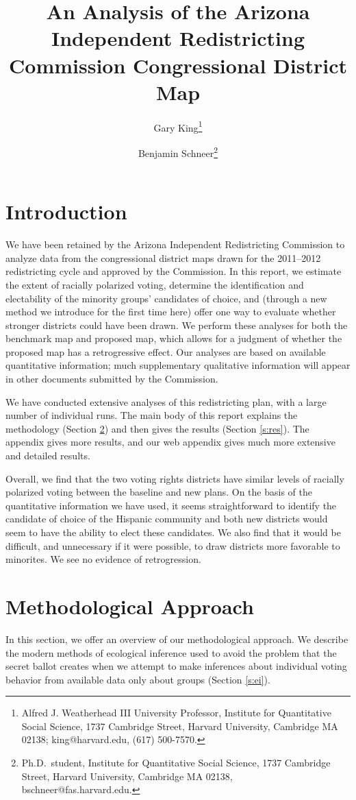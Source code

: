 \documentclass[12pt,draft]{scrartcl}
\title{An Analysis of the Arizona Independent Redistricting Commission
  Congressional District Map}
\author{Gary King\thanks{Alfred J. Weatherhead III University Professor, Institute for Quantitative
    Social Science, 1737 Cambridge Street, Harvard University,
    Cambridge MA 02138; 
    king@harvard.edu, (617) 500-7570.}  
\and 
Benjamin Schneer\thanks{Ph.D.\ student, Institute for Quantitative Social
    Science, 1737 Cambridge Street, Harvard University, Cambridge MA
    02138, bschneer@fas.harvard.edu.}}
\begin{document}
\maketitle

\doublespacing

\section{Introduction}

We have been retained by the Arizona Independent Redistricting
Commission to analyze data from the congressional district maps drawn
for the 2011--2012 redistricting cycle and approved by the Commission.
In this report, we estimate the extent of racially polarized voting,
determine the identification and electability of the minority groups'
candidates of choice, and (through a new method we introduce for the
first time here) offer one way to evaluate whether stronger districts
could have been drawn.  We perform these analyses for both the
benchmark map and proposed map, which allows for a judgment of whether
the proposed map has a retrogressive effect.  Our analyses are based
on available quantitative information; much supplementary qualitative
information will appear in other documents submitted by the
Commission.

We have conducted extensive analyses of this redistricting plan, with
a large number of individual runs. The main body of this report
explains the methodology (Section \ref{s:methods}) and then gives the
results (Section \ref{s:res}).  The appendix gives more results, and
our web appendix gives much more extensive and detailed results.

Overall, we find that the two voting rights districts have similar
levels of racially polarized voting between the baseline and new
plans.  On the basis of the quantitative information we have used, it
seems straightforward to identify the candidate of choice of the
Hispanic community and both new districts would seem to have the
ability to elect these candidates.  We also find that it would be
difficult, and unnecessary if it were possible, to draw districts more
favorable to minorites.  We see no evidence of retrogression.

\section{Methodological Approach}
\label{s:methods}

In this section, we offer an overview of our methodological approach.
We describe the modern methods of ecological inference used to avoid
the problem that the secret ballot creates when we attempt to make
inferences about individual voting behavior from available data only
about groups (Section \ref{s:ei}).
\end{document}
